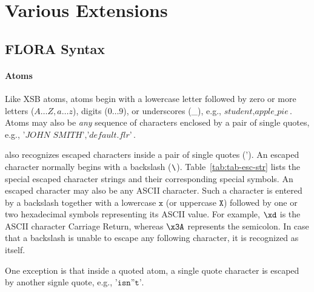 \documentclass[11pt]{report}
\begin{document}
\section{Various Extensions}

\subsection{FLORA Syntax}

\paragraph{Atoms}

Like XSB atoms, \FLORA atoms begin with a lowercase letter followed by zero or more letters
($A \ldots Z, a \ldots z$), digits ($0 \ldots 9$), or underscores (\_), e.g.,
$\textit{student}, \textit{apple\_pie}$. Atoms may also be \emph{any} sequence
of characters enclosed by a pair of single quotes, e.g.,
$\textit{'JOHN SMITH'},\textit{'default.flr'}$.

\FLORA also recognizes escaped characters inside a pair of single quotes ($\texttt{'}$).
An escaped character normally begins with a backslash ($\texttt{\bksl}$).
Table~\ref{tab:tab-esc-str}
lists the special escaped character strings and their corresponding special symbols. An
escaped character may also be any ASCII character. Such a character is entered by
a backslash together with a lowercase $\texttt{x}$ (or uppercase $\texttt{X}$) followed
by one or two hexadecimal symbols representing its ASCII value. For example,
$\texttt{{\bksl}xd}$
is the ASCII character Carriage Return, whereas $\texttt{{\bksl}x3A}$ represents the
semicolon. In case that a backslash is unable to escape any following character, it is
recognized as itself. 

One exception is that inside a quoted atom, a single quote character is escaped by another
signle quote, e.g., $\texttt{'isn''t'}$.
\end{document}
